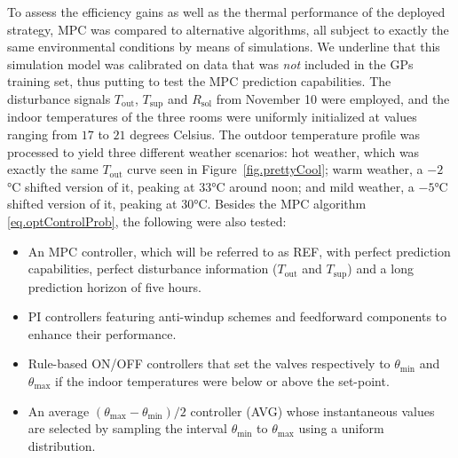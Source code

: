 To assess the efficiency gains as well as the thermal performance of the deployed strategy, MPC was compared to alternative algorithms, all subject to exactly the same environmental conditions by means of simulations. We underline that this simulation model was calibrated on data that was \textit{not} included in the GPs training set, thus putting to test the MPC prediction capabilities. The disturbance signals $T_\text{out}$, $T_\text{sup}$ and $R_\text{sol}$ from November 10 were employed, and the indoor temperatures of the three rooms were uniformly initialized at values ranging from $17$ to $21$ degrees Celsius. The outdoor temperature profile was processed to yield three different weather scenarios: hot weather, which was exactly the same $T_\text{out}$ curve seen in Figure~\ref{fig.prettyCool}; warm weather, a $-2$°C shifted version of it, peaking at 33°C around noon; and mild weather, a $-5$°C shifted version of it, peaking at 30°C. Besides the MPC algorithm \eqref{eq.optControlProb}, the following were also tested:
\begin{itemize}
	\item An MPC controller, which will be referred to as REF, with perfect prediction capabilities, perfect disturbance information ($T_\text{out}$ and $T_\text{sup}$) and a long prediction horizon of five hours.
	\item PI controllers featuring anti-windup schemes and feedforward components to enhance their performance.
	\item Rule-based ON/OFF controllers that set the valves respectively to $\theta_\text{min}$ and $\theta_\text{max}$ if the indoor temperatures were below or above the set-point. 
	\item An average $(\theta_\text{max}-\theta_\text{min})/2$ controller (AVG) whose instantaneous values are selected by sampling the interval $\theta_\text{min}$ to $\theta_\text{max}$ using a uniform distribution.
\end{itemize}

